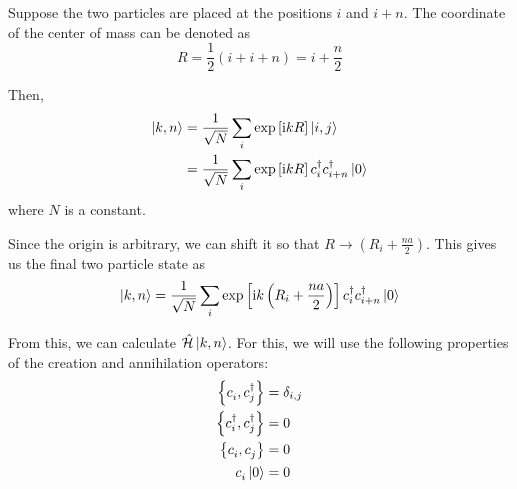 \documentclass[a4paper, 11pt]{report}
\newcommand{\I}{\mathrm{i}}
\begin{document}
Suppose the two particles are placed at the positions $i$ and $i + n$. The coordinate of the center of mass can be denoted as
\begin{displaymath}
R = \frac{1}{2} \left( i + i + n \right) = i + \frac{n}{2}
\end{displaymath}

Then,
\begin{displaymath}
\begin{split}
\ket{k, n}  &= \frac{1}{\sqrt{N}} \sum_{i}\exp\left[ \I k R\right]  \ket{i, j}\\
			&= \frac{1}{\sqrt{N}} \sum_{i}\exp\left[ \I k R\right]  c^{\dagger}_{i} c^{\dagger}_{i + n} \ket{0}\\
\end{split}
\end{displaymath}
where $N$ is a constant.

Since the origin is arbitrary, we can shift it so that $R \longrightarrow \left(R_i + \frac{n a}{2}\right)$. This gives us the final two particle state as
\begin{equation}
\ket{k,n} = \frac{1}{\sqrt{N}} \sum_{i}\exp\left[ \I k \left( R_i + \frac{n a}{2}\right) \right]  c^{\dagger}_{i} c^{\dagger}_{i + n} \ket{0}
\end{equation}

From this, we can calculate $\hat{\mathcal{H}} \ket{k, n}$. For this, we will use the following properties of the creation and annihilation operators:
\begin{eqnarray}
\acomm{c^{}_i}{c^{\dagger}_j} &= \delta_{i,j}\\
\acomm{c^{\dagger}_i}{c^{\dagger}_j} &= 0\\
\acomm{c^{}_i}{c^{}_j} &= 0\\
c^{}_i\ket{0} &= 0
\end{eqnarray}
\end{document}
